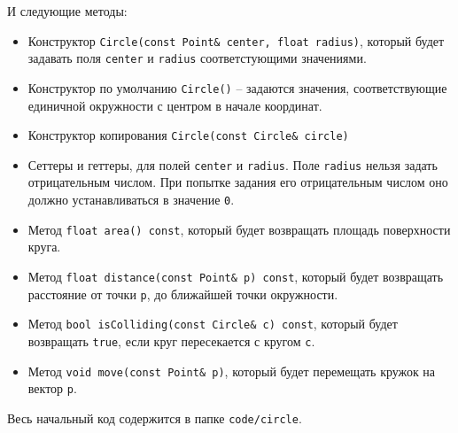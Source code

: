 \documentclass{article}
\begin{document}
И следующие методы:
\begin{itemize}
\item Конструктор \texttt{Circle(const Point\& center, float radius)}, который будет задавать поля \texttt{center} и \texttt{radius} соответстующими значениями.
\item Конструктор по умолчанию \texttt{Circle()} -- задаются значения, соответствующие единичной окружности с центром в начале координат.
\item Конструктор копирования \texttt{Circle(const Circle\& circle)}
\item Сеттеры и геттеры, для полей \texttt{center} и \texttt{radius}. Поле \texttt{radius} нельзя задать отрицательным числом. При попытке задания его отрицательным числом оно должно устанавливаться в значение \texttt{0}.
\item Метод \texttt{float area() const}, который будет возвращать площадь поверхности круга.
\item Метод \texttt{float distance(const Point\& p) const}, который будет возвращать расстояние от точки \texttt{p}, до ближайшей точки окружности.
\item Метод \texttt{bool isColliding(const Circle\& c) const}, который будет возвращать \texttt{true}, если круг пересекается с кругом \texttt{c}.
\item Метод \texttt{void move(const Point\& p)}, который будет перемещать кружок на вектор \texttt{p}.
\end{itemize}
Весь начальный код содержится в папке \texttt{code/circle}.
\end{document}
